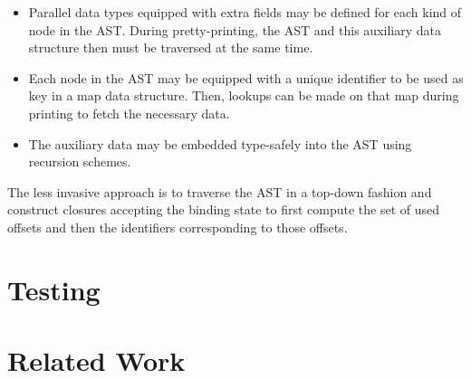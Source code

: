 \begin{itemize}
\item
Parallel data types equipped with extra fields may be defined for each kind of node in the \ac{AST}.
During pretty-printing, the \ac{AST} and this auxiliary data structure then must be traversed at the same time.
\item
Each node in the \ac{AST} may be equipped with a unique identifier to be used as key in a map data structure.
Then, lookups can be made on that map during printing to fetch the necessary data.
\item
The auxiliary data may be embedded type-safely into the \ac{AST} using recursion schemes.
\end{itemize}

The less invasive approach is to traverse the \ac{AST} in a top-down fashion and construct closures accepting the binding state to first compute the set of used offsets and then the identifiers corresponding to those offsets.


\section{Testing}


\section{Related Work}
